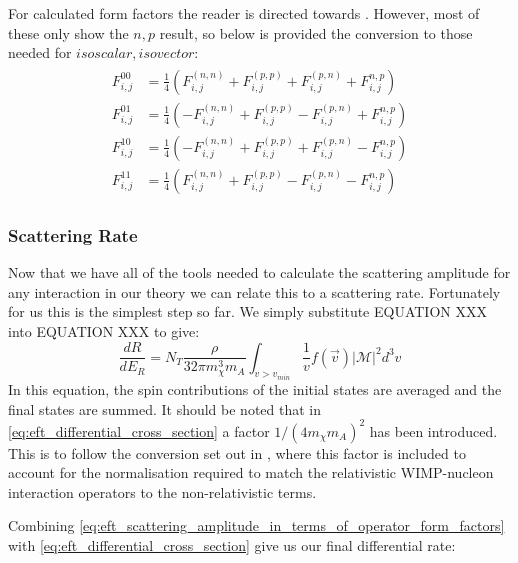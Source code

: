 \par
For calculated form factors the reader is directed towards \cite{Fitzpatrick_2013_ref, dmformfactor_ref, nicolelarsen_thesis_ref}.
However, most of these only show the {$n,p$} result, so below is provided the conversion to those needed for {$isoscalar,isovector$}:
\begin{align}
    \begin{split}
        F_{i,j}^{00}    &= \frac{1}{4} \left( F_{i,j}^{(n,n)} + F_{i,j}^{(p,p)} + F_{i,j}^{(p,n)} + F_{i,j}^{n,p} \right) \\
        F_{i,j}^{01}    &= \frac{1}{4} \left( -F_{i,j}^{(n,n)} + F_{i,j}^{(p,p)} - F_{i,j}^{(p,n)} + F_{i,j}^{n,p} \right) \\
        F_{i,j}^{10}    &= \frac{1}{4} \left( -F_{i,j}^{(n,n)} + F_{i,j}^{(p,p)} + F_{i,j}^{(p,n)} - F_{i,j}^{n,p} \right) \\
        F_{i,j}^{11}    &= \frac{1}{4} \left( F_{i,j}^{(n,n)} + F_{i,j}^{(p,p)} - F_{i,j}^{(p,n)} - F_{i,j}^{n,p} \right)
    \end{split}
\end{align}

\subsubsection{Scattering Rate}
\par
Now that we have all of the tools needed to calculate the scattering amplitude for any interaction in our theory we can relate this to a scattering rate.
Fortunately for us this is the simplest step so far.
We simply substitute EQUATION XXX into EQUATION XXX to give:
\begin{equation}
    \frac{dR}{dE_R} = N_T \frac{\rho}{32 \pi m_\chi^3 m_A} \int_{v>v_{min}} \frac{1}{v}f(\vec{v}) | \mathcal{M} |^2 d^3 v 
    \label{eq:eft_differential_cross_section}
\end{equation}
In this equation, the spin contributions of the initial states are averaged and the final states are summed.
It should be noted that in \autoref{eq:eft_differential_cross_section} a factor $1/(4m_\chi m_A)^2$ has been introduced.
This is to follow the conversion set out in \cite{dmformfactor_ref}, where this factor is included to account for the normalisation required to match the relativistic WIMP-nucleon interaction operators to the non-relativistic terms.

Combining \autoref{eq:eft_scattering_amplitude_in_terms_of_operator_form_factors} with \autoref{eq:eft_differential_cross_section} give us our final differential rate:

